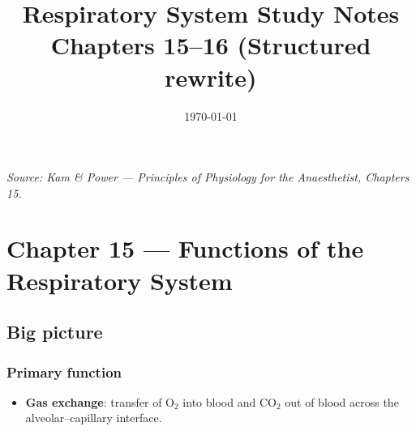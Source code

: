 \documentclass[11pt,a4paper]{article}
\title{Respiratory System Study Notes\\Chapters 15--16 (Structured rewrite)}
\author{}
\date{\today}
\begin{document}
\maketitle

\noindent\textit{Source: Kam \& Power --- Principles of Physiology for the Anaesthetist, Chapters 15.}

\tableofcontents
\newpage

\section{Chapter 15 --- Functions of the Respiratory System}

\subsection{Big picture}

\subsubsection{Primary function}
\begin{itemize}[leftmargin=*,nosep]
  \item \textbf{Gas exchange}: transfer of O$_2$ into blood and CO$_2$ out of blood across the alveolar--capillary interface.
\end{itemize}
\end{document}
